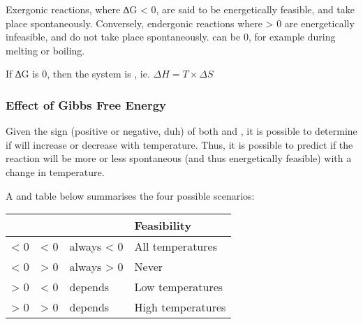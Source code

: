 			Exergonic reactions, where ∆G < 0, are said to be energetically feasible, and take place spontaneously. Conversely, endergonic
			reactions where \gibb{} > 0 are energetically infeasible, and do not take place spontaneously. \gibb{} can be 0, for example during
			melting or boiling.

			If ∆G is 0, then the system is , ie. $\Delta H = T\times \Delta S$

			\subsubsection{Effect of Gibbs Free Energy}

				Given the sign (positive or negative, duh) of both \enth{} and \entr{}, it is possible to determine if \gibb{} will increase
				or decrease with temperature. Thus, it is possible to predict if the reaction will be more or less spontaneous
				(and thus energetically feasible) with a change in temperature.

				A  and  table below summarises the four possible scenarios:

				\begin{center}\begin{table}[htb]\renewcommand{\arraystretch}{1.5}
				\begin{tabu} to \textwidth {| X[c,m] | X[c,m] | X[c,m] | X[c,m] |}

					\hline		\enth{}		&	\entr{}		&	\gibb{}		&		Feasibility			\\

					\hline		< 0			&	< 0			&	always < 0	&		All temperatures	\\
					\hline		< 0			&	> 0			&	always > 0	&				Never		\\
					\hline		> 0			&	< 0			&	depends		&		Low temperatures	\\
					\hline		> 0			&	> 0			&	depends		&		High temperatures	\\
					\hline

				\end{tabu}
				\end{table}\end{center}\vspace{-10mm}





















































